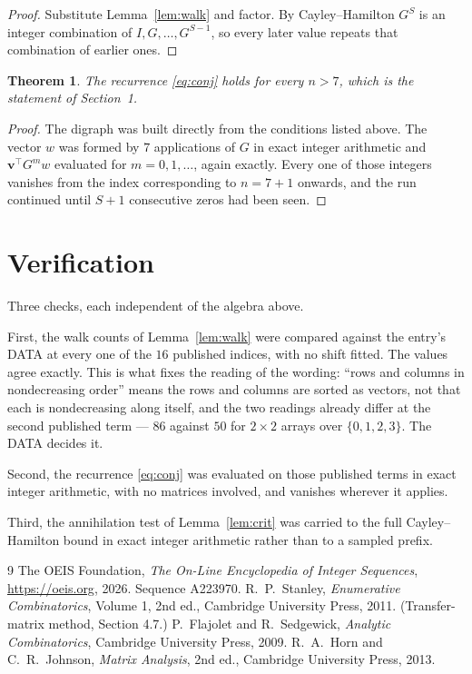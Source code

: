 \documentclass[11pt,a4paper]{article}
\theoremstyle{plain}
\newtheorem{theorem}{Theorem}
\theoremstyle{definition}
\begin{document}
\begin{proof}
Substitute Lemma~\ref{lem:walk} and factor. By Cayley--Hamilton $G^{S}$ is an integer
combination of $I,G,\dots,G^{S-1}$, so every later value repeats that combination of
earlier ones.
\end{proof}

\begin{theorem}
The recurrence \eqref{eq:conj} holds for every $n>7$, which is the statement of
Section~1.
\end{theorem}

\begin{proof}
The digraph was built directly from the conditions listed above. The vector $w$ was formed by
$7$ applications of $G$ in exact integer arithmetic and $\mathbf{v}^{\!\top}G^{m}w$
evaluated for $m=0,1,\dots$, again exactly. Every one of those integers vanishes from the
index corresponding to $n=7+1$ onwards, and the run continued until $S+1$ consecutive
zeros had been seen.
\end{proof}

\section{Verification}

Three checks, each independent of the algebra above.

First, the walk counts of Lemma~\ref{lem:walk} were compared against the entry's DATA at
every one of the $16$ published indices, with no shift fitted. The values agree exactly.
This is what fixes the reading of the wording: ``rows and columns in nondecreasing order''
means the rows and columns are sorted as vectors, not that each is nondecreasing along
itself, and the two readings already differ at the second published term --- $86$ against
$50$ for $2\times2$ arrays over $\{0,1,2,3\}$. The DATA decides it.

Second, the recurrence \eqref{eq:conj} was evaluated on those published terms in exact
integer arithmetic, with no matrices involved, and vanishes wherever it applies.

Third, the annihilation test of Lemma~\ref{lem:crit} was carried to the full
Cayley--Hamilton bound in exact integer arithmetic rather than to a sampled prefix.

\begin{thebibliography}{9}
 The OEIS Foundation, \emph{The On-Line Encyclopedia of Integer
Sequences}, \url{https://oeis.org}, 2026. Sequence A223970.
 R.~P.~Stanley, \emph{Enumerative Combinatorics}, Volume 1, 2nd ed.,
Cambridge University Press, 2011. (Transfer-matrix method, Section 4.7.)
 P.~Flajolet and R.~Sedgewick, \emph{Analytic Combinatorics}, Cambridge
University Press, 2009.
 R.~A.~Horn and C.~R.~Johnson, \emph{Matrix Analysis}, 2nd ed., Cambridge
University Press, 2013.
\end{thebibliography}
\end{document}
